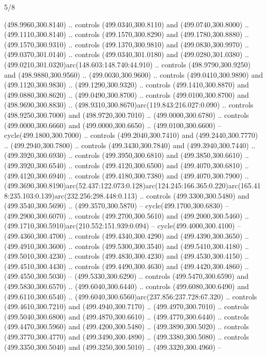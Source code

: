 \begin{flagdescription}{5/8}
\begin{scope}[xshift=0.5\flaglength,yshift=0.5\flagwidth,scale=\flagwidth/475.63]
\begin{scope}[y=0.8pt, x=0.8pt, yscale=-1, xscale=1,shift={(-450,-300)}]
\begin{scope}[cm={{1.0,0.0,0.0,1.0,(-0.0002,0.12556)}},cm={{1.0,0.0,0.0,1.0,(0.00179,0.0)}}]
\begin{scope}[cm={{1.11592,0.0,0.0,1.11592,(-106.89933,-41.77764)}}]
\begin{scope}[draw=black,fill=cfff]
\begin{scope}[fill=black]
  (498.9960,300.8140) .. controls (499.0340,300.8110) and (499.0740,300.8000) ..
  (499.1110,300.8140) .. controls (499.1570,300.8290) and (499.1780,300.8880) ..
  (499.1570,300.9310) .. controls (499.1370,300.9810) and (499.0830,300.9970) ..
  (499.0370,301.0140) .. controls (499.0340,301.0180) and (499.0280,301.0380) ..
  (499.0210,301.0320)arc(148.603:148.740:44.910) .. controls (498.9790,300.9250)
  and (498.9880,300.9560) .. (499.0030,300.9600) .. controls (499.0410,300.9890)
  and (499.1120,300.9830) .. (499.1290,300.9320) .. controls (499.1410,300.8870)
  and (499.0880,300.8620) .. (499.0490,300.8700) .. controls (499.0100,300.8700)
  and (498.9690,300.8830) .. (498.9310,300.8670)arc(119.843:216.027:0.090) ..
  controls (498.9250,300.7000) and (498.9720,300.7010) .. (499.0000,300.6780) ..
  controls (499.0000,300.6660) and (499.0000,300.6650) .. (499.0100,300.6600) --
  cycle(499.1800,300.7000) .. controls (499.2040,300.7410) and
  (499.2440,300.7770) .. (499.2940,300.7800) .. controls (499.3430,300.7840) and
  (499.3940,300.7440) .. (499.3920,300.6930) .. controls (499.3950,300.6810) and
  (499.3850,300.6610) .. (499.3920,300.6540) .. controls (499.4120,300.6500) and
  (499.4070,300.6810) .. (499.4120,300.6940) .. controls (499.4180,300.7380) and
  (499.4070,300.7900) ..
  (499.3690,300.8190)arc(52.437:122.073:0.128)arc(124.245:166.365:0.220)arc(165.418:235.103:0.139)arc(232.256:298.448:0.113)
  .. controls (499.3300,300.5480) and (499.3540,300.5690) .. (499.3570,300.5870)
  -- cycle(499.1700,300.6830) -- (499.2900,300.6070) .. controls
  (499.2700,300.5610) and (499.2000,300.5460) ..
  (499.1710,300.5910)arc(210.552:151.939:0.094) -- cycle(499.4000,300.4100) --
  (499.4360,300.4700) .. controls (499.4340,300.4290) and (499.4390,300.3650) ..
  (499.4910,300.3600) .. controls (499.5300,300.3540) and (499.5410,300.4180) ..
  (499.5010,300.4230) .. controls (499.4830,300.4230) and (499.4530,300.4150) ..
  (499.4510,300.4430) .. controls (499.4490,300.4630) and (499.4420,300.4860) ..
  (499.4550,300.5030) -- (499.5330,300.6290) .. controls (499.5470,300.6590) and
  (499.5830,300.6570) .. (499.6040,300.6440) .. controls (499.6080,300.6490) and
  (499.6110,300.6540) .. (499.6040,300.6560)arc(237.856:237.728:67.320) ..
  controls (499.4610,300.7210) and (499.4940,300.7170) .. (499.4970,300.7010) ..
  controls (499.5040,300.6800) and (499.4870,300.6610) .. (499.4770,300.6440) ..
  controls (499.4470,300.5960) and (499.4200,300.5480) .. (499.3890,300.5020) ..
  controls (499.3770,300.4770) and (499.3490,300.4890) .. (499.3380,300.5080) ..
  controls (499.3350,300.5040) and (499.3250,300.5010) .. (499.3320,300.4960) --

\end{scope}
\end{scope}
\end{scope}
\end{scope}
\end{scope}
\end{scope}
\end{flagdescription}
